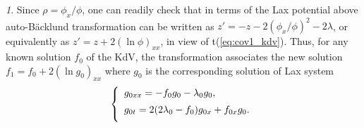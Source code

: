 \documentclass[12pt,english]{elsarticle}
\theoremstyle{plain}
\theoremstyle{plain}
\theoremstyle{remark}
\newtheorem{rem}[thm]{\protect\remarkname}
\theoremstyle{plain}
\theoremstyle{definition}
\theoremstyle{definition}
\providecommand{\remarkname}{Remark}
\begin{document}
\begin{rem}
\label{rem20}
Since $\rho =\phi _{x}/\phi $, one can readily check that in terms of the
Lax potential above auto-B\"{a}cklund transformation can be written as
$z'=-z-2(\phi _{x}/\phi )^{2}-2\lambda $, or equivalently as
$z'=z+2\left (\ln \phi \right )_{xx}$, in view of t{(\ref{eq:cov1_kdv})}.
Thus, for any known solution $f_{0}$ of the KdV, the transformation associates
the new solution $f_{1}=f_{0}+2\left (\ln g_{0}\right )_{xx}$ where
$g_{0}$ is the corresponding solution of Lax system
%
\begin{equation*}
\left \{
%
\begin{array}{l}
g_{0xx}=-f_{0}g_{0}-\lambda _{0}g_{0},
\vspace{5pt}
\\
g_{0t}=2(2\lambda _{0}-f_{0})g_{0x}+f_{0x}g_{0}.
\vspace{5pt}
\end{array}
%
\right .
\end{equation*}
%
\end{rem}
\end{document}
